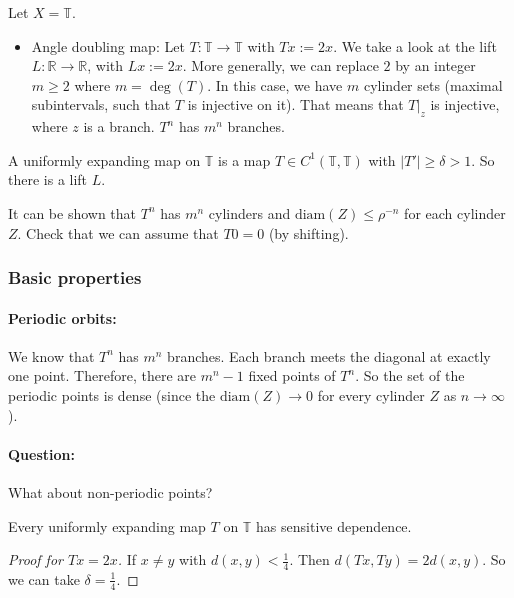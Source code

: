 \documentclass{article}
\newcommand*{\R}{\mathbb{R}}
\newcommand*{\T}{\mathbb{T}}
\newcommand*{\reci}[1]{{\frac{1}{#1}}}
\newcommand*{\diam}{\text{diam}}
\begin{document}
\begin{exam}[Prototypical]
    Let $X = \T$.
    \begin{itemize}
        \item Angle doubling map: Let $T:\T\to\T$ with $Tx:=2x$. We take a look at the lift $L:\R\to\R$, with $Lx:=2x$. More generally, we can replace $2$ by an integer $m\geq 2$ where $m=\deg(T)$. In this case, we have $m$ cylinder sets (maximal subintervals, such that $T$ is injective on it). That means that $T|_z$ is injective, where $z$ is a branch. $T^n$ has $m^n$ branches.
    \end{itemize}
\end{exam}

\begin{defin}
    A uniformly expanding map on $\T$ is a map $T\in C^1(\T,\T)$ with $|T'|\geq \delta > 1$. So there is a lift $L$.
\end{defin}

It can be shown that $T^n$ has $m^n$ cylinders and $\diam(Z)\leq \rho^{-n}$ for each cylinder $Z$. Check that we can assume that $T0=0$ (by shifting).

\subsubsection{Basic properties}

\paragraph{Periodic orbits:}
We know that $T^n$ has $m^n$ branches. Each branch meets the diagonal at exactly one point. Therefore, there are $m^n-1$ fixed points of $T^n$. So the set of the periodic points is dense (since the $\diam(Z)\to0$ for every cylinder $Z$ as $n\to\infty$).

\paragraph{Question:}
What about non-periodic points?

\begin{prop}
    Every uniformly expanding map $T$ on $\T$ has sensitive dependence.
\end{prop}

\begin{proof}[Proof for $Tx=2x$]
    If $x\neq y$ with $d(x,y) < \reci4$. Then $d(Tx,Ty)=2d(x,y)$. So we can take $\delta = \reci4$.
\end{proof}
\end{document}
